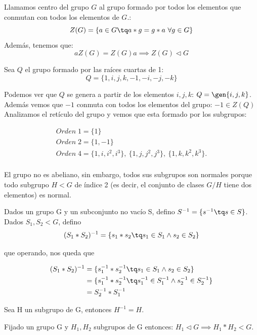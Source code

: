 \documentclass{apuntes}
\begin{document}
\begin{defn}
	Llamamos centro del grupo $G$ al grupo formado por todos los elementos que conmutan con todos los elementos de $G$.:\\
	\[ Z(G) = \{ a\in G\tq a\ast g = g\ast a\ \forall g\in G\} \]
	Además, tenemos que:
	\[ aZ(G)=Z(G)a \implies Z(G)\lhd G \]
  \end{defn}  
  
  \begin{example}
	Sea $Q$ el grupo formado por las raíces cuartas de 1:
	\[ Q = \{ 1, i, j, k, -1, -i, -j, -k\} \] 
	
	Podemos ver que $Q$ se genera a partir de los elementos $i, j, k$: $Q = \gen{i,j,k}$.
	Además vemos que $-1$ conmuta con todos los elementos del grupo: $-1 \in Z(Q)$
	Analizamos el retículo del grupo y vemos que esta formado por los subgrupos:
	
	\begin{gather*}
	Orden\; 1 = \{ 1\}\\
	Orden\; 2 = \{ 1, -1\} \\
	Orden\; 4 = \{ 1, i, i^2, i^3\},\
			  \{ 1, j, j^2, j^3 \},\
			  \{ 1, k, k^2, k^3 \}.\\
			  \end{gather*}
			  
		  
	El grupo no es abeliano, sin embargo, todos sus subgrupos son normales porque todo subgrupo $H<G$ de índice 2 (es decir, el conjunto de clases $G/H$ tiene dos elementos) es normal.
	
  \end{example}
  
 
 Dados un grupo G y un subconjunto no vacío S, defino $S^{-1}=\{s^{-1}\tq s\in S\}$. Dados $S_{1},S_{2}<G$, defino  \[ (S_{1}\ast S_{2})^{-1}=\{s_{1}\ast s_{2}\tq s_{1}\in S_{1} \wedge s_{2}\in S_{2}\} \]
 
 que operando, nos queda que 
 
 \begin{align*}
 (S_1 \ast S_2)^{-1} &= \{s_{1}^{-1}\ast s_{2}^{-1}\tq s_{1}\in S_{1} \wedge s_{2}\in S_{2}\}\\
 &= \{s_{1}^{-1}\ast s_{2}^{-1}\tq s_{1}^{-1}\in S_{1}^{-1} \wedge s_{2}^{-1}\in S_{2}^{-1}\} \\
 & =S_{2}^{-1}\ast S_{1}^{-1}
 \end{align*}
 
 Sea H un subgrupo de G, entonces $H^{-1}=H$.
 
 \begin{theorem}
  Fijado un grupo G y $H_{1}, H_{2}$  subgrupos de G entonces: $H_{1} \lhd G \implies H_{1}\ast H_{2}<G$. 
 \end{theorem}
 
\end{document}
